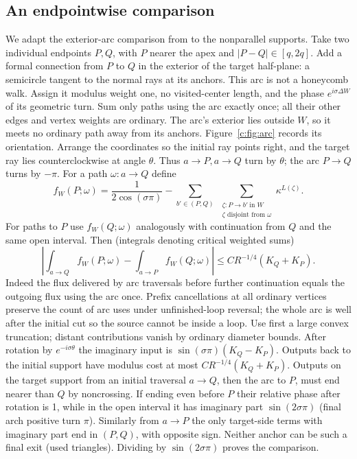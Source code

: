 \documentclass[11pt]{article}
\numberwithin{equation}{section}
\theoremstyle{definition}\newtheorem{definition}[theorem]{Definition}
\theoremstyle{remark}\newtheorem{remark}[theorem]{Remark}
\begin{document}
\subsection{An endpointwise comparison}\label{c:tilted-comparison}
We adapt the exterior-arc comparison from
\cite[proof of Proposition 7.1]{UniformMarked} to the nonparallel supports.
Take two individual endpoints \(P,Q\), with \(P\) nearer the apex and \(|P-Q|\in[q,2q]\). Add a formal connection from $P$ to $Q$ in the exterior of the target half-plane: a semicircle tangent to the normal rays at its anchors. This arc is not a honeycomb walk. Assign it modulus weight one, no visited-center length, and the phase $e^{i\sigma\Delta W}$ of its geometric turn. Sum only paths using the arc exactly once; all their other edges and vertex weights are ordinary. The arc's exterior lies outside $W$, so it meets no ordinary path away from its anchors. Figure~\ref{c:fig:arc} records its orientation. Arrange the coordinates so the initial ray points right, and the target ray lies counterclockwise at angle \(\theta\). Thus \(a\to P,a\to Q\) turn by \(\theta\); the arc \(P\to Q\) turns by \(-\pi\). For a path \(\omega:a\to Q\) define
\[
 f_W(P;\omega)=\frac1{2\cos(\sigma\pi)}-
 \sum_{b'\in(P,Q)}\ 
 \sum_{\substack{\zeta:P\to b'\ \text{in }W\\ \zeta\text{ disjoint from }\omega}}
 \kappa^{L(\zeta)}.
\]
For paths to \(P\) use \(f_W(Q;\omega)\) analogously with continuation from \(Q\) and the same open interval. Then (integrals denoting critical weighted sums)
\[
 \left|\int_{a\to Q} f_W(P;\omega)-\int_{a\to P} f_W(Q;\omega)\right|
 \le C R^{-1/4}(K_Q+K_P).
\]
Indeed the flux delivered by arc traversals before further continuation equals the outgoing flux using the arc once. Prefix cancellations at all ordinary vertices preserve the count of arc uses under unfinished-loop reversal; the whole arc is well after the initial cut so the source cannot be inside a loop. Use first a large convex truncation; distant contributions vanish by ordinary diameter bounds. After rotation by \(e^{-i\sigma\theta}\) the imaginary input is \(\sin(\sigma\pi)(K_Q-K_P)\). Outputs back to the initial support have modulus cost at most \(C R^{-1/4}(K_Q+K_P)\). Outputs on the target support from an initial traversal \(a\to Q\), then the arc to \(P\), must end nearer than \(Q\) by noncrossing. If ending even before \(P\) their relative phase after rotation is 1, while in the open interval it has imaginary part \(\sin(2\sigma\pi)\) (final arch positive turn \(\pi\)). Similarly from \(a\to P\) the only target-side terms with imaginary part end in \((P,Q)\), with opposite sign. Neither anchor can be such a final exit (used triangles). Dividing by \(\sin(2\sigma\pi)\) proves the comparison.
\end{document}
